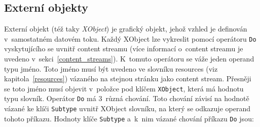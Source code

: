\subsection*{Externí objekty} \label{XObject}
Externí objekt (též taky \emph{XObject}) je grafický objekt, jehož vzhled
je definován v~samostatném datovém toku.
Každý XObject lze vykreslit pomocí operátoru \texttt{Do} vyskytujícího se uvnitř
content streamu (více informací o~content streamu je uvedeno 
v~sekci~\ref{content_streams}). K~tomuto operátoru se váže jeden operand typu 
jméno. Toto jméno
musí být uvedeno ve slovníku resources (viz kapitola~\ref{resources}) vázaného
na stejnou stránku jako content stream. Přesněji se toto jméno musí objevit
v~položce pod klíčem \texttt{XObject}, která má hodnotu typu slovník. Operátor
\texttt{Do} má 3~různá chování. Toto chování závisí na hodnotě vázané ke klíči
\texttt{Subtype} uvnitř XObject slovníku, na který se odkazuje operand tohoto
příkazu. Hodnoty klíče \texttt{Subtype} a~k~nim vázané chování příkazu
\texttt{Do} jsou:
